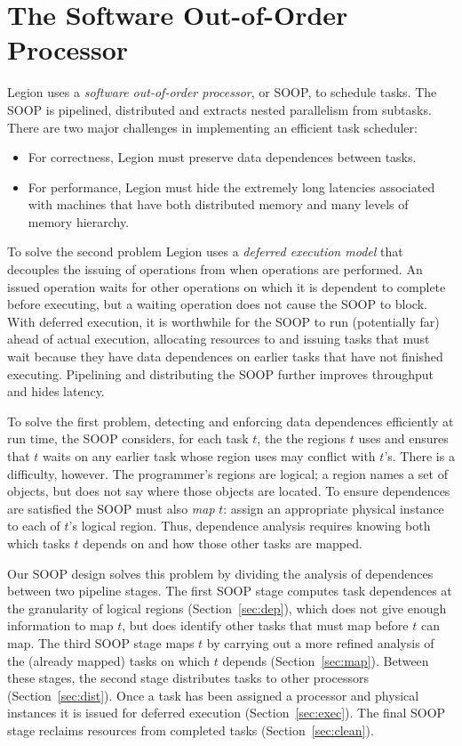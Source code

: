 \section{The Software Out-of-Order Processor}
\label{sec:soop}

Legion uses a {\em  software out-of-order processor}, or SOOP, to schedule tasks.  The SOOP 
is pipelined, distributed and extracts nested parallelism from subtasks.
There are two major challenges in implementing an efficient task scheduler:
\begin{itemize}
\item  For correctness, Legion must preserve data dependences between tasks.

\item For performance, Legion must hide the extremely long latencies associated
  with machines that have both distributed memory and many levels of
  memory hierarchy.
\end{itemize}

To solve the second problem Legion uses a {\em deferred execution model} that decouples the issuing
of operations from when operations are performed.  An issued operation waits for other operations on
which it is dependent to complete before executing, but a waiting operation does not cause the SOOP
to block.  With deferred execution, it is worthwhile for the SOOP to run (potentially far) ahead of actual execution,
allocating resources to and issuing tasks that must wait because they have data dependences on earlier tasks that have not 
finished executing.   Pipelining and distributing the SOOP further improves throughput and hides latency.

To solve the first problem, detecting and enforcing data dependences
efficiently at run time, the SOOP considers, for each task $t$, the
the regions $t$ uses and ensures that $t$ waits on any
earlier task whose region uses may conflict with $t$'s.  There is a
difficulty, however.  The programmer's regions are logical; a region
names a set of objects, but does not say where those objects
are located.  To ensure dependences are satisfied the SOOP must also {\em map} $t$: assign an
appropriate physical instance to each of $t$'s logical region.  Thus, dependence
analysis requires knowing both which tasks $t$ depends on and how those
other tasks are mapped.

Our SOOP design solves this problem by dividing the analysis of
dependences between two pipeline stages.  The first SOOP stage
computes task dependences at the granularity of logical regions
(Section~\ref{sec:dep}), which does not give enough information to map
$t$, but does identify other tasks that must map before $t$ can map.
The third SOOP stage maps $t$ by carrying out a more refined analysis
of the (already mapped) tasks on which $t$ depends
(Section~\ref{sec:map}).  Between these stages, the second stage
distributes tasks to other processors (Section~\ref{sec:dist}).  Once
a task has been assigned a processor and physical instances it is
issued for deferred execution (Section~\ref{sec:exec}).  The final
SOOP stage reclaims resources from completed tasks
(Section~\ref{sec:clean}).

